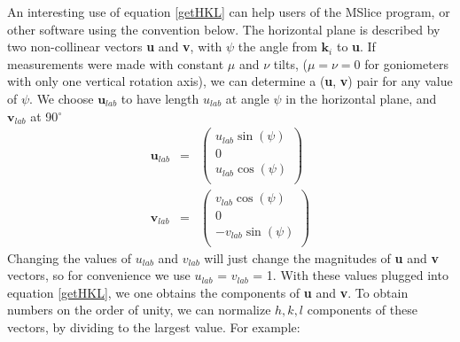 \documentclass[prb]{revtex4}%
\begin{document}
An interesting use of equation \ref{getHKL} can help users of the MSlice program, or other software using the convention below.
The horizontal plane is described by two non-collinear vectors \textbf{u} and \textbf{v}, with $\psi$ the angle from
$\textbf{k}_i$ to \textbf{u}. If measurements were made with constant $\mu$ and $\nu$ tilts, ($\mu = \nu = 0$
for goniometers with only one vertical rotation axis), we can determine a (\textbf{u}, \textbf{v}) pair for any value of $\psi$.
We choose $\textbf{u}_{lab}$ to have length $u_{lab}$ at angle $\psi$ in the horizontal plane, and $\textbf{v}_{lab}$ at 90$^\circ$
\begin{eqnarray}
  \textbf{u}_{lab} &=& \left(
                     \begin{array}{c}
                       u_{lab} \sin(\psi) \\
                       0 \\
                       u_{lab} \cos(\psi) \\
                     \end{array}
                   \right)
   \\
  \textbf{v}_{lab} &=& \left(
                     \begin{array}{c}
                       v_{lab} \cos(\psi) \\
                       0 \\
                       -v_{lab} \sin(\psi) \\
                     \end{array}
                   \right)
\end{eqnarray}
Changing the values of $u_{lab}$ and $v_{lab}$ will just change the magnitudes of \textbf{u} and \textbf{v} vectors,
so for convenience we use $u_{lab}$ = $v_{lab}$ = 1. With these values plugged
into equation \ref{getHKL}, we one obtains the components of \textbf{u} and \textbf{v}. To obtain numbers on the order of unity,
we can normalize $h, k, l$ components of these vectors, by dividing to the largest value. For example:
\end{document}
